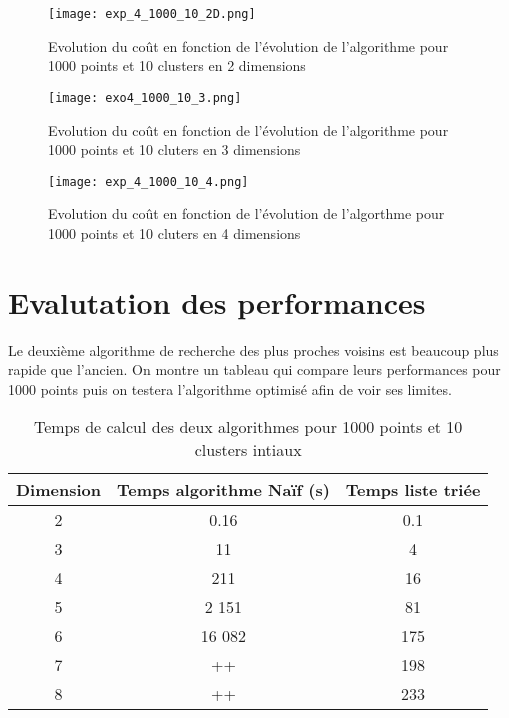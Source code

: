 \documentclass[a4paper,english,titlepage]{article}
\begin{document}
	\begin{figure}[h!]
		\hspace*{0mm}\vfill
		\begin{center}		
		\texttt{[image: exp\_4\_1000\_10\_2D.png]}
		\caption{Evolution du coût en fonction de l'évolution de l'algorithme pour 1000 points et 10 clusters en 2 dimensions}
 	 	\end{center}  
		\vfill\hspace*{0mm}	
	\end{figure}
  	\begin{figure}[h!]
		\hspace*{0mm}\vfill
		\begin{center}
		\texttt{[image: exo4\_1000\_10\_3.png]}	
		\caption{Evolution du coût en fonction de l'évolution de l'algorithme pour 1000 points et 10 cluters en 3 dimensions}
 		\end{center}  
		\vfill\hspace*{0mm}
	\end{figure}
  	\begin{figure}[h!]
		\hspace*{0mm}\vfill
		\begin{center}
		\texttt{[image: exp\_4\_1000\_10\_4.png]}	
		\caption{Evolution du coût en fonction de l'évolution de l'algorthme pour 1000 points et 10 cluters en 4  dimensions}
 		\end{center}  
		\vfill\hspace*{0mm}
	\end{figure}


\section{Evalutation des performances}
	Le deuxième algorithme de recherche des plus proches voisins est beaucoup plus rapide que l'ancien. On montre un tableau qui compare 
	leurs performances pour 1000 points puis on testera l'algorithme optimisé afin de voir ses limites.

	\begin{table}[!ht]
		\center
		\begin{tabular}{|c|c|c|}
	  	\hline
		Dimension & Temps algorithme Naïf (s) & Temps liste triée \\
	    \hline
		2 & 0.16 & 0.1\\
		3 & 11 & 4\\
		4 & 211 & 16\\
		5 & 2 151 & 81\\
		6 & 16 082 & 175 \\
		7 & ++ & 198 \\
		8 & ++ & 233\\
		\hline
		\end{tabular}	  
		\caption{Temps de calcul des deux algorithmes pour 1000 points et 10 clusters intiaux}
	\end{table}
\end{document}
